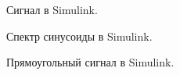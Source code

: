 \documentclass[12pt,a4paper]{scrartcl}
\begin{document}
\begin{figure}[h!]
\caption{Сигнал в Simulink.}
\end{figure}

\newpage
\begin{figure}[h!]
\caption{Спектр синусоиды в Simulink.}
\end{figure}

\begin{figure}[h!]
\caption{Прямоугольный сигнал в Simulink.}
\end{figure}
\end{document}

